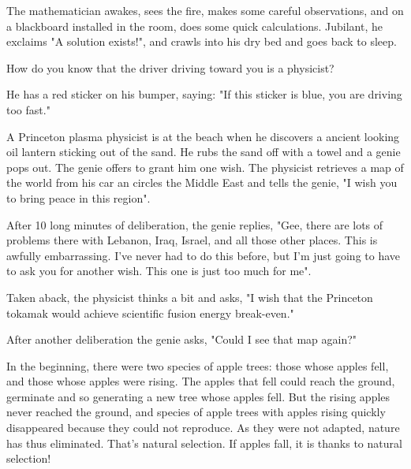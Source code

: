 The mathematician awakes, sees the fire, makes some careful observations, and on a blackboard installed in the room, does some quick calculations. Jubilant, he exclaims "A solution exists!", and crawls into his dry bed and goes back to sleep.
	\begin{center}\underline{\hspace{5 cm}}\end{center}

How do you know that the driver driving toward you is a physicist?

He has a red sticker on his bumper, saying: "If this sticker is blue, you are driving too fast."
	\begin{center}\underline{\hspace{5 cm}}\end{center}

A Princeton plasma physicist is at the beach when he discovers a ancient looking oil lantern sticking out of the sand. He rubs the sand off with a towel and a genie pops out. The genie offers to grant him one wish. The physicist retrieves a map of the world from his car an circles the Middle East and tells the genie, "I wish you to bring peace in this region".

After 10 long minutes of deliberation, the genie replies, "Gee, there are lots of problems there with Lebanon, Iraq, Israel, and all those other places. This is awfully embarrassing. I've never had to do this before, but I'm just going to have to ask you for another wish. This one is just too much for me".

Taken aback, the physicist thinks a bit and asks, "I wish that the Princeton tokamak would achieve scientific fusion energy break-even."

After another deliberation the genie asks, "Could I see that map again?"	
	\begin{center}\underline{\hspace{5 cm}}\end{center}

In the beginning, there were two species of apple trees: those whose apples fell, and those whose apples were rising. The apples that fell could reach the ground, germinate and so generating a new tree whose apples fell. But the rising apples never reached the ground, and species of apple trees with apples rising quickly disappeared because they could not reproduce. As they were not adapted, nature has thus eliminated. That's natural selection. If apples fall, it is thanks to natural selection!

